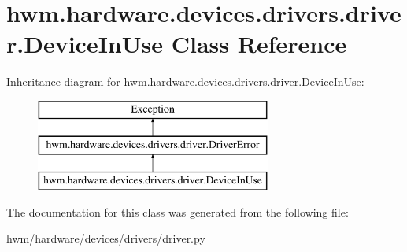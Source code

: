 \hypertarget{classhwm_1_1hardware_1_1devices_1_1drivers_1_1driver_1_1_device_in_use}{\section{hwm.\-hardware.\-devices.\-drivers.\-driver.\-Device\-In\-Use Class Reference}
\label{classhwm_1_1hardware_1_1devices_1_1drivers_1_1driver_1_1_device_in_use}
}
Inheritance diagram for hwm.\-hardware.\-devices.\-drivers.\-driver.\-Device\-In\-Use\-:\begin{figure}[H]
\begin{center}
\leavevmode
\includegraphics[height=3.000000cm]{classhwm_1_1hardware_1_1devices_1_1drivers_1_1driver_1_1_device_in_use}
\end{center}
\end{figure}


The documentation for this class was generated from the following file\-:\begin{DoxyCompactItemize}
\item 
hwm/hardware/devices/drivers/driver.\-py\end{DoxyCompactItemize}
